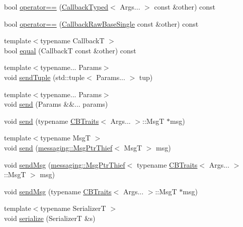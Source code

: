 \begin{DoxyCompactItemize}
bool \hyperlink{structvt_1_1pipe_1_1callback_1_1cbunion_1_1_callback_typed_a1256a1709839698421b422baa622f8c8}{operator==} (\hyperlink{structvt_1_1pipe_1_1callback_1_1cbunion_1_1_callback_typed}{Callback\+Typed}$<$ Args... $>$ const \&other) const
\item 
bool \hyperlink{structvt_1_1pipe_1_1callback_1_1cbunion_1_1_callback_typed_ad6e3b2becf075db7375919d6072f12d2}{operator==} (\hyperlink{structvt_1_1pipe_1_1callback_1_1cbunion_1_1_callback_raw_base_single}{Callback\+Raw\+Base\+Single} const \&other) const
\item 
{\footnotesize template$<$typename CallbackT $>$ }\\bool \hyperlink{structvt_1_1pipe_1_1callback_1_1cbunion_1_1_callback_typed_ae71e236d0851fa19672e2777edfe81dd}{equal} (CallbackT const \&other) const
\item 
{\footnotesize template$<$typename... Params$>$ }\\void \hyperlink{structvt_1_1pipe_1_1callback_1_1cbunion_1_1_callback_typed_a6214b3bfdc8eba01bdfff2afb98bcf67}{send\+Tuple} (std\+::tuple$<$ Params... $>$ tup)
\item 
{\footnotesize template$<$typename... Params$>$ }\\void \hyperlink{structvt_1_1pipe_1_1callback_1_1cbunion_1_1_callback_typed_a7977d8ee9e8e28158865f0ad72ea91a4}{send} (Params \&\&... params)
\item 
void \hyperlink{structvt_1_1pipe_1_1callback_1_1cbunion_1_1_callback_typed_aa1cd1c0c5877d75e9ee3e34b910f95b5}{send} (typename \hyperlink{structvt_1_1_c_b_traits}{C\+B\+Traits}$<$ Args... $>$\+::MsgT $\ast$msg)
\item 
{\footnotesize template$<$typename MsgT $>$ }\\void \hyperlink{structvt_1_1pipe_1_1callback_1_1cbunion_1_1_callback_typed_a241a0a2bab21374bb792873935eeba19}{send} (\hyperlink{structvt_1_1messaging_1_1_msg_ptr_thief}{messaging\+::\+Msg\+Ptr\+Thief}$<$ MsgT $>$ msg)
\item 
void \hyperlink{structvt_1_1pipe_1_1callback_1_1cbunion_1_1_callback_typed_a9dc1f441d1444b9b3404509cc2afe768}{send\+Msg} (\hyperlink{structvt_1_1messaging_1_1_msg_ptr_thief}{messaging\+::\+Msg\+Ptr\+Thief}$<$ typename \hyperlink{structvt_1_1_c_b_traits}{C\+B\+Traits}$<$ Args... $>$\+::MsgT $>$ msg)
\item 
void \hyperlink{structvt_1_1pipe_1_1callback_1_1cbunion_1_1_callback_typed_aa8d1b59ff3d662bea81b5f359fdd6d3b}{send\+Msg} (typename \hyperlink{structvt_1_1_c_b_traits}{C\+B\+Traits}$<$ Args... $>$\+::MsgT $\ast$msg)
\item 
{\footnotesize template$<$typename SerializerT $>$ }\\void \hyperlink{structvt_1_1pipe_1_1callback_1_1cbunion_1_1_callback_typed_af8158d7a51fd77c604849970aecc3780}{serialize} (SerializerT \&s)
\end{DoxyCompactItemize}
